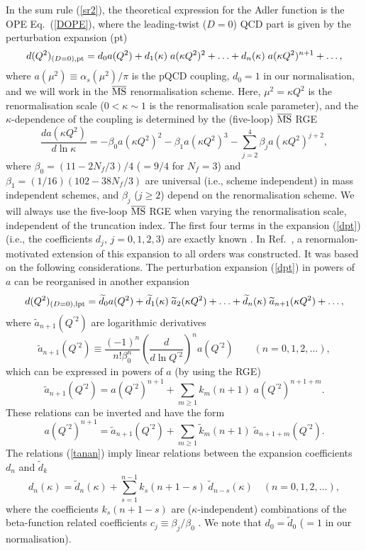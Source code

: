 \documentclass[aps,nofootinbib,showkeys,noshowpacs,preprintnumbers,amsmath,amssymb]{revtex4}
\def\be{\begin{equation}}
\def\ee{\end{equation}}
\newcommand{\tk}{{\widetilde k}}
\newcommand{\ta}{{\widetilde a}}
\newcommand{\td}{{\widetilde d}}
\newcommand{\MSbar}{\overline{\rm MS}}
\begin{document}
In the sum rule (\ref{sr2}), the theoretical expression for the Adler function is the OPE Eq.~(\ref{DOPE}), where the leading-twist ($D=0$) QCD part is given by the perturbation expansion (pt)
\be
d(Q^2)_{(D=0), {\rm pt}}= d_0 a(Q^2) + d_1(\kappa) \; a(\kappa Q^2)^2 + \ldots + d_n(\kappa) \; a(\kappa Q^2)^{n+1} + \ldots,
\label{dpt}
\ee
where $a(\mu^2) \equiv \alpha_s(\mu^2)/\pi$ is the pQCD coupling, $d_0=1$ in our normalisation, and we will work in the $\MSbar$ renormalisation scheme. Here, $\mu^2=\kappa Q^2$ is the renormalisation scale ($0 < \kappa \sim 1$ is the renormalisation scale parameter), and the $\kappa$-dependence of the coupling is determined by the (five-loop) $\MSbar$ RGE \cite{5lMSbarbeta}
\be
\frac{d a(\kappa Q^2)}{d \ln \kappa} = - \beta_0 a(\kappa Q^2)^2 -\beta_1 a(\kappa Q^2)^3 - \sum_{j=2}^4 {\beta}_j a(\kappa Q^2)^{j+2},
\label{RGE}
\ee
where $\beta_0 = (11 - 2 N_f/3)/4$ ($=9/4$ for $N_f=3$) and $\beta_1=(1/16)(102 - 38 N_f/3)$ are universal (i.e., scheme independent) in mass independent schemes, and ${\beta}_j$ ($j \geq 2$) depend on the renormalisation scheme. We will always use the five-loop $\MSbar$ RGE when varying the renormalisation scale, independent of the truncation index. The first four terms in the expansion (\ref{dpt}) (i.e., the coefficients $d_j$, $j=0,1,2,3$) are exactly known \cite{d1,d2,BCK}. In Ref.~\cite{renmod}, a renormalon-motivated extension of this expansion to all orders was constructed. It was based on the following considerations. The perturbation expansion (\ref{dpt}) in powers of $a$ can be reorganised in another expansion
\be
d(Q^2)_{(D=0), {\rm lpt}}= {\td}_0 a(Q^2) + {\td}_1(\kappa) \; {\ta}_2(\kappa Q^2) + \ldots + {\td}_n(\kappa) \; {\ta}_{n+1}(\kappa Q^2) + \ldots,
\label{dlpt} \ee
where ${\ta}_{n+1}(Q^{'2})$ are logarithmic derivatives
\be
\ta_{n+1}(Q^{'2}) \equiv \frac{(-1)^n}{n! \beta_0^n} \left( \frac{d}{d \ln Q^{'2}} \right)^n a(Q^{'2}) \qquad (n=0,1,2,\ldots),
\label{tan} \ee
which can be expressed in powers of $a$ (by using the RGE)
\be
\ta_{n+1}(Q^{'2}) = a(Q^{'2})^{n+1} + \sum_{m \geq 1} k_m(n+1) \; a(Q^{'2})^{n+1+m}.
\label{tanan}
\ee
These relations can be inverted and have the form
\be a(Q^{'2})^{n+1} =  \ta_{n+1}(Q^{'2}) + \sum_{m \geq 1} \tk_m(n+1) \; \ta_{n+1+m}(Q^{'2}).
\label{antan} \ee
The relations (\ref{tanan}) imply linear relations between the expansion coefficients $d_n$ and $\td_k$
\be
d_n(\kappa) = \td_n(\kappa) + \sum_{s=1}^{n-1} k_s(n+1-s) \; \td_{n-s}(\kappa) \quad
(n=0,1,2, \ldots),
\label{dntdk} \ee
where the coefficients $k_s(n+1-s)$ are ($\kappa$-independent) combinations of the beta-function related coefficients $c_j \equiv \beta_j/\beta_0$ \cite{renmod}. We note that $d_0 = \td_0$ ($=1$ in our normalisation).
\end{document}
